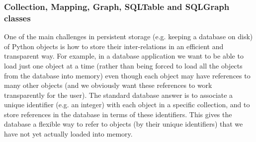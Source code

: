 \documentclass{howto}
\begin{document}
\subsubsection{Collection, Mapping, Graph, SQLTable and SQLGraph classes}
One of the main challenges in persistent storage (e.g. keeping a database
on disk) of Python objects is how to store their inter-relations
in an efficient and transparent way.  For example, in a database
application we want to be able to load just one object at a time
(rather than being forced to load all the objects from the database into memory)
even though each object may have references to many other objects
(and we obviously want these references to work transparently for the
user).  The standard database answer is to associate a unique identifier
(e.g. an integer) with each object in a specific collection, and
to store references in the database in terms of these identifiers.
This gives the database a flexible way to refer to objects (by their unique
identifiers) that we have not yet actually loaded into memory.  
\end{document}
